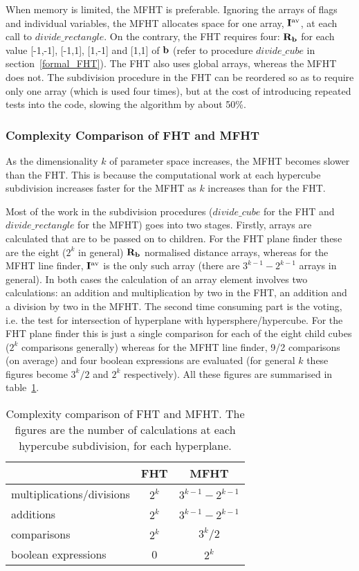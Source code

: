   When memory is limited, the MFHT is preferable. Ignoring the arrays
  of flags and individual variables, the MFHT allocates space for one array,
  ${\bf I}^{\rm av}$, at each call to $divide\_rectangle$. On the contrary,
  the FHT requires four: ${\bf R}_{\bf b}$ for each value [-1,-1], [-1,1],
  [1,-1] and [1,1] of ${\bf b}$ (refer to procedure $divide\_cube$ in
  section~\ref{formal_FHT}). The FHT also uses global arrays, whereas the MFHT
  does not. The subdivision procedure in the FHT can be
  reordered so as to require only one array (which is used four times),
  but at the cost of introducing repeated tests into the code,
  slowing the algorithm by about 50\%.

  \subsubsection{Complexity Comparison of FHT and MFHT}
   As the dimensionality $k$ of parameter space increases, the MFHT becomes
   slower than the FHT. This is because the computational work at each
   hypercube subdivision increases faster for the MFHT as $k$ increases
   than for the FHT.

   Most of the work in the subdivision procedures ($divide\_cube$ for the
   FHT and $divide\_rectangle$ for the MFHT) goes into two stages.
   Firstly, arrays are calculated that are to be passed on to children.
   For the FHT plane finder these are the eight ($2^k$ in general)
   ${\bf R}_{\bf b}$ normalised distance arrays, whereas for the MFHT
   line finder, ${\bf I}^{\rm av}$ is the only such array
   (there are $3^{k-1} - 2^{k-1}$ arrays in general).
   In both cases the calculation of an array element involves two calculations:
   an addition and multiplication by two in the FHT, an addition and a division
   by two in the MFHT. The second time consuming part is the voting, i.e.
   the test for intersection of hyperplane with hypersphere/hypercube.
   For the FHT plane finder this is just a single comparison for each of
   the eight child cubes ($2^k$ comparisons generally) whereas for the MFHT
   line finder, 9/2 comparisons (on average) and four boolean
   expressions are evaluated (for general $k$ these figures become
   $3^k/2$ and $2^k$ respectively). All these figures are summarised in
   table~\ref{FHT_MFHT_complexity}.
   \begin{table}
    \centering
    \begin{tabular}{|l|c|c|}
     \hline
     & FHT & MFHT \\
     \hline
     multiplications/divisions & $2^k$ & $3^{k-1} - 2^{k-1}$ \\
     \hline
     additions & $2^k$ & $3^{k-1} - 2^{k-1}$ \\
     \hline
     comparisons & $2^k$ & $3^k/2$ \\
     \hline
     boolean expressions & 0 & $2^k$ \\
     \hline
    \end{tabular}
    \caption[Complexity comparison of FHT and MFHT.]
	    {Complexity comparison of FHT and MFHT. The figures are the number
	     of calculations at each hypercube subdivision,
	     for each hyperplane.}
    \label{FHT_MFHT_complexity}
   \end{table}

